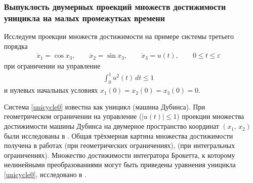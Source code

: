 \documentclass[../main.tex]{subfiles}
\begin{document}
\subsubsection{Выпуклость двумерных проекций множеств достижимости уницикла на малых промежутках времени} 
 Исследуем проекции множеств достижимости на примере системы третьего порядка
 \begin{gather}\label{unicycle0}
 \dot{x}_1 = \cos x_3, \qquad
 \dot{x}_2 = \sin x_3, \qquad
 \dot{x}_3 = u(t), \qquad 0 \leqslant t \leqslant \varepsilon
 \end{gather}
 при ограничении на управление 
 \begin{gather*}
\int_0^1 u^2(t) \, dt \leqslant 1
 \end{gather*}
 и нулевых начальных условиях $ x_1(0) = x_2(0) = x_3(0) = 0 $.
 
 Система \eqref{unicycle0} известна как уницикл (машина Дубинса). 
При геометрическом
 ограничении на
 управление ($|u(t)|\leqslant 1$) проекции множества достижимости машины Дубинса на двумерное пространство координат $(x_1,\,x_2)$ были исследованы в
 \cite{Cockayne}. 
Общая трёхмерная картина множества достижимости получена в
 работах \cite{Patsko} (при геометрических ограничениях), \cite{Patsko2023} (при интегральных ограничениях). 
Множество достижимости интегратора Брокетта, к которому нелинейными преобразованиями могут быть приведены уравнения уницикла \eqref{unicycle0}, исследовано в \cite{Vdovin}.
 
\end{document}
